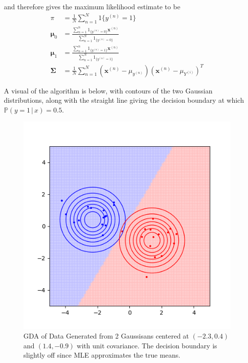 \documentclass{article}
\begin{document}
      and therefore gives the maximum likelihood estimate to be 
      \begin{align*}
        \pi & = \frac{1}{N} \sum_{n=1}^N 1\{y^{(n)} = 1\} \\
        \boldsymbol{\mu}_0 & = \frac{\sum_{n=1}^n 1_{\{y^{(n)} = 0 \}} \mathbf{x}^{(n)}}{\sum_{n=1}^N 1_{\{y^{(n)} = 0 \}}} \\
        \boldsymbol{\mu}_1 & = \frac{\sum_{n=1}^n 1_{\{y^{(n)} = 1\}} \mathbf{x}^{(n)}}{\sum_{n=1}^N 1_{\{y^{(n)} = 1 \}}} \\
        \boldsymbol{\Sigma} & = \frac{1}{N} \sum_{n=1}^N (\mathbf{x}^{(n)} - \mu_{y^{(n)}}) (\mathbf{x}^{(n)} - \mu_{Y^{(i)}})^T 
      \end{align*}

      A visual of the algorithm is below, with contours of the two Gaussian distributions, along with the straight line giving the decision boundary at which $\mathbb{P}(y=1\,|\,x) = 0.5$. 
      \begin{figure}[H]
          \centering
          \includegraphics[scale=0.7]{img/GDA.png}
          \caption{GDA of Data Generated from 2 Gaussisans centered at $(-2.3, 0.4)$ and $(1.4, -0.9)$ with unit covariance. The decision boundary is slightly off since MLE approximates the true means. }
          \label{fig:gda}
      \end{figure}
\end{document}
